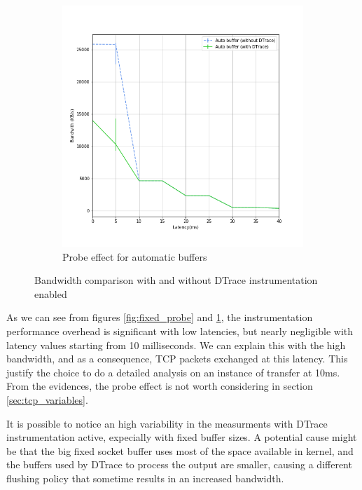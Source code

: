 \documentclass[a4paper,10pt]{article}
\begin{document}
\begin{figure}[]
\begin{subfigure}{0.5\textwidth}
   \includegraphics[width=\textwidth]{images/auto_probe_effect.png}
    \caption{Probe effect for automatic buffers}
    \label{fig:auto_probe}
\end{subfigure}

\caption[short]{Bandwidth comparison with and without DTrace instrumentation enabled}
\label{fig:probe_effect}
\end{figure}


As we can see from figures \ref{fig:fixed_probe} and \ref{fig:auto_probe}, the instrumentation performance overhead is significant with low latencies, but nearly negligible with latency values starting from 10 milliseconds. We can explain this with the high bandwidth, and as a consequence, TCP packets exchanged at this latency. This justify the choice to do a detailed analysis on an instance of transfer at 10ms. From the evidences, the probe effect is not worth considering in section \ref{sec:tcp_variables}.

It is possible to notice an high variability in the measurments with DTrace instrumentation active, expecially with fixed buffer sizes. A potential cause might be that the big fixed socket buffer uses most of the space available in kernel, and the buffers used by DTrace to process the output are smaller, causing a different flushing policy that sometime results in an increased bandwidth.
\end{document}

